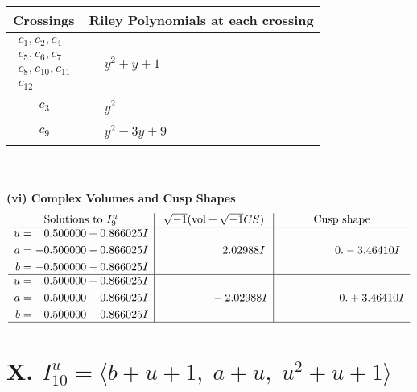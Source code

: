 \documentclass[1p]{elsarticle_modified}
\theoremstyle{definition}
\newcommand{\I}{\sqrt{-1}}
\begin{document}
\begin{tabular}{m{50pt}|m{274pt}}
Crossings & \hspace{64pt}Riley Polynomials at each crossing \\
\hline $$\begin{aligned}c_{1},c_{2},c_{4}\\c_{5},c_{6},c_{7}\\c_{8},c_{10},c_{11}\\c_{12}\end{aligned}$$&$\begin{aligned}
&y^2+y+1
\end{aligned}$\\
\hline $$\begin{aligned}c_{3}\end{aligned}$$&$\begin{aligned}
&y^2
\end{aligned}$\\
\hline $$\begin{aligned}c_{9}\end{aligned}$$&$\begin{aligned}
&y^2-3 y+9
\end{aligned}$\\
\hline
\end{tabular}\\~\\
\newpage\flushleft \textbf{(vi) Complex Volumes and Cusp Shapes}
$$\begin{array}{c|c|c}  
\text{Solutions to }I^u_{9}& \I (\text{vol} + \sqrt{-1}CS) & \text{Cusp shape}\\
 \hline 
\begin{aligned}
u &= \phantom{-}0.500000 + 0.866025 I \\
a &= -0.500000 - 0.866025 I \\
b &= -0.500000 - 0.866025 I\end{aligned}
 & \phantom{-0.000000 -}2.02988 I & \phantom{-0.000000 } 0. - 3.46410 I \\ \hline\begin{aligned}
u &= \phantom{-}0.500000 - 0.866025 I \\
a &= -0.500000 + 0.866025 I \\
b &= -0.500000 + 0.866025 I\end{aligned}
 & \phantom{-0.000000 } -2.02988 I & \phantom{-0.000000 -}0. + 3.46410 I\\
 \hline 
 \end{array}$$\newpage\newpage\renewcommand{\arraystretch}{1}
\centering \section*{X. $I^u_{10}= \langle b+u+1,\;a+u,\;u^2+u+1 \rangle$}
\end{document}
